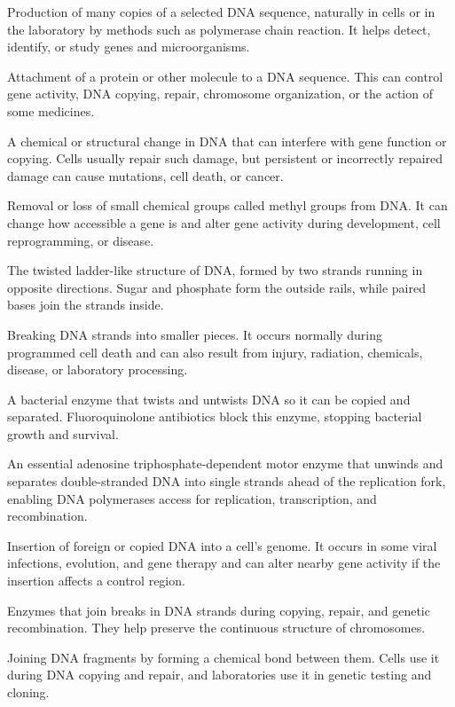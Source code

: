  Production of many copies of a selected DNA sequence, naturally in cells or in the laboratory by methods such as polymerase chain reaction. It helps detect, identify, or study genes and microorganisms.

 Attachment of a protein or other molecule to a DNA sequence. This can control gene activity, DNA copying, repair, chromosome organization, or the action of some medicines.

 A chemical or structural change in DNA that can interfere with gene function or copying. Cells usually repair such damage, but persistent or incorrectly repaired damage can cause mutations, cell death, or cancer.

 Removal or loss of small chemical groups called methyl groups from DNA. It can change how accessible a gene is and alter gene activity during development, cell reprogramming, or disease.

 The twisted ladder-like structure of DNA, formed by two strands running in opposite directions. Sugar and phosphate form the outside rails, while paired bases join the strands inside.

 Breaking DNA strands into smaller pieces. It occurs normally during programmed cell death and can also result from injury, radiation, chemicals, disease, or laboratory processing.

 A bacterial enzyme that twists and untwists DNA so it can be copied and separated. Fluoroquinolone antibiotics block this enzyme, stopping bacterial growth and survival.

 An essential adenosine triphosphate-dependent motor enzyme that unwinds and separates double-stranded DNA into single strands ahead of the replication fork, enabling DNA polymerases access for replication, transcription, and recombination.

 Insertion of foreign or copied DNA into a cell’s genome. It occurs in some viral infections, evolution, and gene therapy and can alter nearby gene activity if the insertion affects a control region.

 Enzymes that join breaks in DNA strands during copying, repair, and genetic recombination. They help preserve the continuous structure of chromosomes.

 Joining DNA fragments by forming a chemical bond between them. Cells use it during DNA copying and repair, and laboratories use it in genetic testing and cloning.

